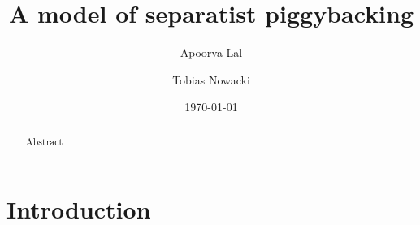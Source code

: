 \documentclass[12pt,reqno]{amsart} %
\title{A model of separatist piggybacking}
\author{Apoorva Lal}
\author{Tobias Nowacki}
\date{\today}
\begin{document}
\begin{abstract} Abstract
\end{abstract}

\maketitle



\section{Introduction} \label{intro}

\lipsum[4]


\renewcommand{\mkbibnamefamily}[1]{\textsc{#1}}
\printbibliography

\appendix


\medskip
\end{document}

